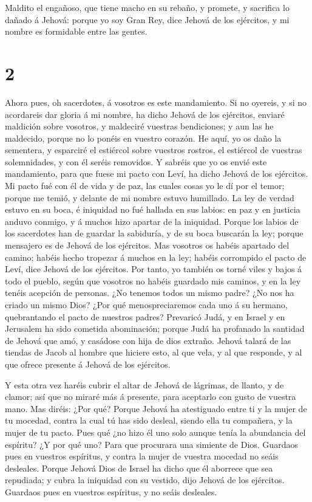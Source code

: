  Maldito el engañoso, que tiene macho en su rebaño, y
promete, y sacrifica lo dañado á Jehová: porque yo soy Gran Rey, dice
Jehová de los ejércitos, y mi nombre es formidable entre las gentes.

\hypertarget{section-1}{%
\section{2}\label{section-1}}

 Ahora pues, oh sacerdotes, á vosotros es este mandamiento.
 Si no oyereis, y si no acordareis dar gloria á mi nombre,
ha dicho Jehová de los ejércitos, enviaré maldición sobre vosotros, y
maldeciré vuestras bendiciones; y aun las he maldecido, porque no lo
ponéis en vuestro corazón.  He aquí, yo os daño la
sementera, y esparciré el estiércol sobre vuestros rostros, el estiércol
de vuestras solemnidades, y con él seréis removidos.  Y
sabréis que yo os envié este mandamiento, para que fuese mi pacto con
Leví, ha dicho Jehová de los ejércitos.  Mi pacto fué con él
de vida y de paz, las cuales cosas yo le dí por el temor; porque me
temió, y delante de mi nombre estuvo humillado.  La ley de
verdad estuvo en su boca, é iniquidad no fué hallada en sus labios: en
paz y en justicia anduvo conmigo, y á muchos hizo apartar de la
iniquidad.  Porque los labios de los sacerdotes han de
guardar la sabiduría, y de su boca buscarán la ley; porque mensajero es
de Jehová de los ejércitos.  Mas vosotros os habéis apartado
del camino; habéis hecho tropezar á muchos en la ley; habéis corrompido
el pacto de Leví, dice Jehová de los ejércitos.  Por tanto,
yo también os torné viles y bajos á todo el pueblo, según que vosotros
no habéis guardado mis caminos, y en la ley tenéis acepción de personas.
 ¿No tenemos todos un mismo padre? ¿No nos ha criado un
mismo Dios? ¿Por qué menospreciaremos cada uno á su hermano,
quebrantando el pacto de nuestros padres?  Prevaricó Judá,
y en Israel y en Jerusalem ha sido cometida abominación; porque Judá ha
profanado la santidad de Jehová que amó, y casádose con hija de dios
extraño.  Jehová talará de las tiendas de Jacob al hombre
que hiciere esto, al que vela, y al que responde, y al que ofrece
presente á Jehová de los ejércitos.

 Y esta otra vez haréis cubrir el altar de Jehová de
lágrimas, de llanto, y de clamor; así que no miraré más á presente, para
aceptarlo con gusto de vuestra mano.  Mas diréis: ¿Por qué?
Porque Jehová ha atestiguado entre ti y la mujer de tu mocedad, contra
la cual tú has sido desleal, siendo ella tu compañera, y la mujer de tu
pacto.  Pues qué ¿no hizo él uno solo aunque tenía la
abundancia del espíritu? ¿Y por qué uno? Para que procurara una simiente
de Dios. Guardaos pues en vuestros espíritus, y contra la mujer de
vuestra mocedad no seáis desleales.  Porque Jehová Dios de
Israel ha dicho que él aborrece que sea repudiada; y cubra la iniquidad
con su vestido, dijo Jehová de los ejércitos. Guardaos pues en vuestros
espíritus, y no seáis desleales.


